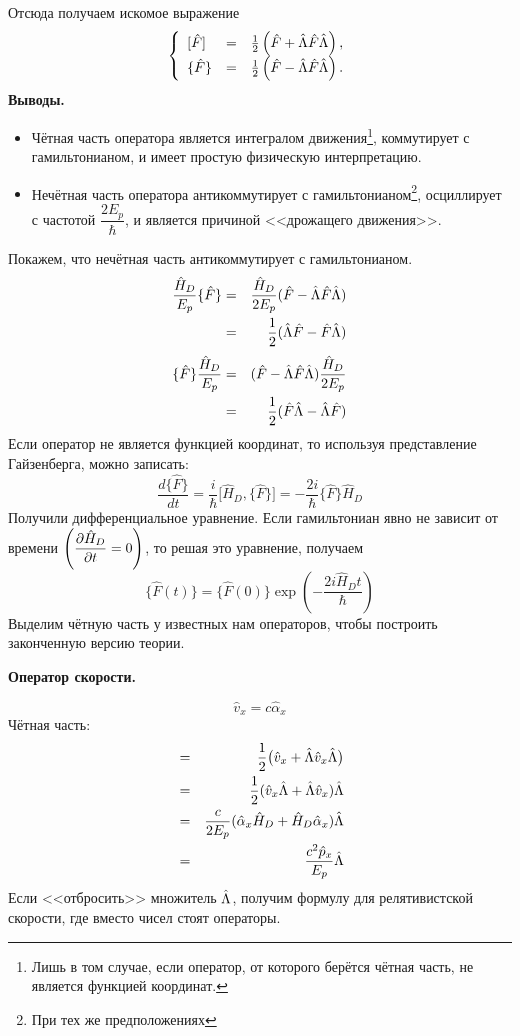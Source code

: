 \begin{itemize}
  Отсюда получаем искомое выражение
  $$
    \left\{
      \begin{array}{lcl}
        [\hat F] & = & \frac12 \left( \hat F + \hat {\Lambda} \hat F \hat {\Lambda} \right) ,\\
        \{\hat F\} & = & \frac12 \left( \hat F - \hat {\Lambda} \hat F \hat {\Lambda} \right).
      \end{array}
    \right.
  $$
  \textbf{Выводы.}
  \begin{itemize}
    \item Чётная часть оператора является интегралом движения\footnote{Лишь в том случае, если оператор, от которого берётся чётная часть, не является функцией координат.}, коммутирует с гамильтонианом, и имеет простую физическую интерпретацию.
    \item Нечётная часть оператора антикоммутирует с гамильтонианом\footnote{При тех же предположениях}, осциллирует с частотой $\dfrac{2 E_p}{\hbar}$, и является причиной <<дрожащего движения>>.
  \end{itemize}
  Покажем, что нечётная часть антикоммутирует с гамильтонианом.
  \begin{eqnarray*}
    \dfrac{\hat H_D}{E_p} \{ \hat F \} &=& \dfrac{\hat H_D}{2 E_p} (\hat F - \hat {\Lambda} \hat F \hat {\Lambda})\\
    &=& \dfrac{1}{2} (\hat {\Lambda} \hat F - \hat F \hat {\Lambda}) 
  \end{eqnarray*}
  \begin{eqnarray*}
    \{ \hat F \} \dfrac{\hat H_D}{E_p}  &=&  (\hat F - \hat {\Lambda} \hat F \hat {\Lambda})\dfrac{\hat H_D}{2 E_p}\\
    &=& \dfrac{1}{2} (\hat F \hat {\Lambda} - \hat {\Lambda} \hat F)
  \end{eqnarray*}
  Если оператор не является функцией координат, то используя представление Гайзенберга, можно записать:
  $$
    \dfrac{d \{\hat F\}}{dt} = \dfrac{i}{\hbar} \big[
        \hat H_D, \{\hat F\}
    \big] = -\dfrac{2i}{\hbar}\{\hat F\} \hat H_D
  $$
  Получили дифференциальное уравнение. Если гамильтониан явно не зависит от времени $\left( \dfrac{\partial \hat H_D}{\partial t} = 0\right)$, то решая это уравнение, получаем
  $$
    \big\{
        \hat F(t)
    \big\} = \big\{
        \hat F(0)
    \big\} \exp \left(
        - \dfrac{2i \hat H_D t}{\hbar}
    \right)
  $$
  Выделим чётную часть у известных нам операторов, чтобы построить законченную версию теории.
  
  \textbf{Оператор скорости.}
  
  $$
    \hat v_x = c \hat \alpha_x
  $$
  Чётная часть:
  \begin{eqnarray*}
    [\hat v_x] &=& \dfrac{1}{2} \big(
        \hat v_x + \hat\La \hat v_x \hat \La
    \big)\\
    &=& \dfrac{1}{2} (\hat v_x \hat \La + \hat\La \hat v_x) \hat \La\\
    &=& \dfrac{c}{2 E_p} (\hat \alpha_x \hat H_D + \hat H_D \hat \alpha_x) \hat \La\\
    &=& \dfrac{c^2 \hat p_x}{E_p} \hat \La
  \end{eqnarray*}
  Если <<отбросить>> множитель $\hat {\Lambda}$, получим формулу для релятивистской скорости, где вместо чисел стоят операторы.
  

\end{itemize}
